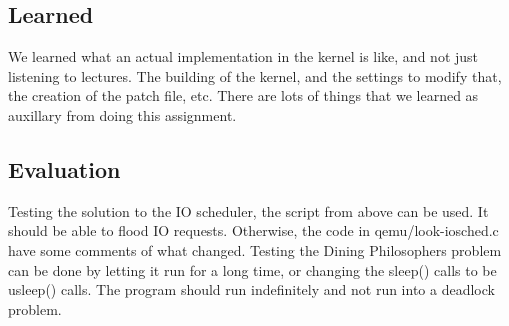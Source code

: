 \documentclass[letterpaper,10pt]{article}
\begin{document}
	\subsection{Learned}
	We learned what an actual implementation in the kernel is like, and not just listening to lectures. The building of the kernel, and the settings to modify that, the creation of the patch file, etc. There are lots of things that we learned as auxillary from doing this assignment.

	\subsection{Evaluation}
	Testing the solution to the IO scheduler, the script from above can be used. It should be able to flood IO requests. Otherwise, the code in qemu/look-iosched.c have some comments of what changed.
	Testing the Dining Philosophers problem can be done by letting it run for a long time, or changing the sleep() calls to be usleep() calls. The program should run indefinitely and not run into a deadlock problem.
	
	
	
\end{document}
